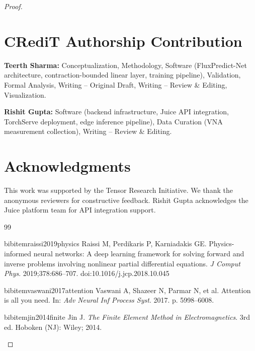 \documentclass[12pt]{article}
\begin{document}
\begin{proof}
\section*{CRediT Authorship Contribution}

\textbf{Teerth Sharma:} Conceptualization, Methodology, Software (FluxPredict-Net architecture, contraction-bounded linear layer, training pipeline), Validation, Formal Analysis, Writing -- Original Draft, Writing -- Review \& Editing, Visualization.

\textbf{Rishit Gupta:} Software (backend infrastructure, Juice API integration, TorchServe deployment, edge inference pipeline), Data Curation (VNA measurement collection), Writing -- Review \& Editing.

\section*{Acknowledgments}

This work was supported by the Tensor Research Initiative. We thank the anonymous reviewers for constructive feedback. Rishit Gupta acknowledges the Juice platform team for API integration support.

\begin{thebibliography}{99}

bibitem{raissi2019physics}
Raissi M, Perdikaris P, Karniadakis GE. Physics-informed neural networks: A deep learning framework for solving forward and inverse problems involving nonlinear partial differential equations. {\em J Comput Phys}. 2019;378:686--707. doi:10.1016/j.jcp.2018.10.045

bibitem{vaswani2017attention}
Vaswani A, Shazeer N, Parmar N, et al. Attention is all you need. In: {\em Adv Neural Inf Process Syst}. 2017. p. 5998--6008.

bibitem{jin2014finite}
Jin J. {\em The Finite Element Method in Electromagnetics}. 3rd ed. Hoboken (NJ): Wiley; 2014.


\end{thebibliography}
\end{proof}
\end{document}
